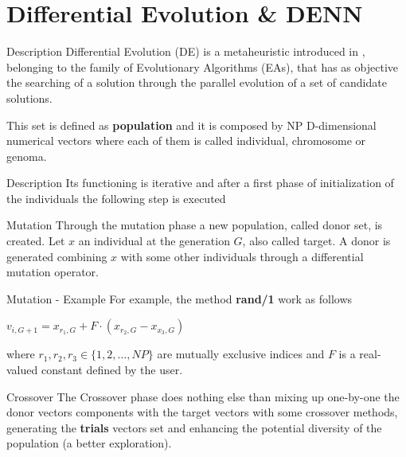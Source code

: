 \documentclass[xcolor={usenames}]{beamer}
\begin{document}
  \section{Differential Evolution \& DENN}
  \begin{frame}{Description}
  	Differential Evolution (DE) is a metaheuristic introduced in \cite{DESEHGOCS:1997}, belonging to the family of Evolutionary Algorithms (EAs), that has as objective the searching of a solution through the parallel evolution of a set of candidate solutions. 
  	
  	This set is defined as \textbf{population} and it is composed by NP D-dimensional numerical vectors where each of them is called individual, chromosome or genoma.
  \end{frame}
  \begin{frame}{Description}
  	Its functioning is iterative and after a first phase of initialization of the individuals the following step is executed
  	\begin{itemize}
  	\end{itemize}
  \end{frame}
  \begin{frame}{Mutation}
  	Through the mutation phase a new population, called donor set, is created. Let $x$ an individual at the generation $G$, also called target. A donor is generated combining $x$ with some other individuals through a differential mutation operator. 
  \end{frame}
  \begin{frame}{Mutation - Example}
  	For example, the method \textbf{rand/1} work as follows 
  	\begin{center}
		$v_{i,G+1} = x_{r_{1},G} + F\cdot(x_{r_{2},G} - x_{x_{3},G})$
	\end{center}
	where $r_{1},r_{2},r_{3} \in \{1,2,\dots,NP\}$ are mutually exclusive indices and $F$ is a real-valued constant defined by the user.
  \end{frame}
  \begin{frame}{Crossover}
  	The Crossover phase does nothing else than mixing up one-by-one the donor vectors components with the target vectors with some crossover methods, generating the \textbf{trials} vectors set and enhancing the potential diversity of the population (a better exploration). 
  \end{frame}
\end{document}
